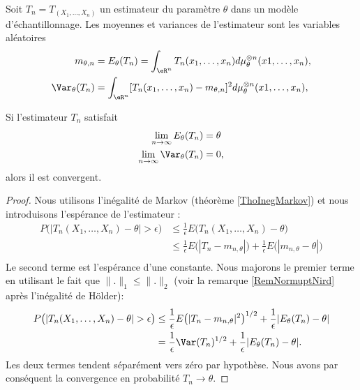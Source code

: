 Soit \( T_n=T_(X_1,\ldots,X_n)\) un estimateur du paramètre \( \theta\) dans un modèle d'échantillonnage. Les moyennes et variances de l'estimateur sont les variables aléatoires
\begin{subequations}
    \begin{align}
        m_{\theta,n}&=E_{\theta}(T_n)=\int_{\eR^n}T_n(x_1,\ldots,x_n)d\mu_{\theta}^{\otimes n}(x1,\ldots,x_n),\\
        \Var_{\theta}(T_n)&=\int_{\eR^n}[T_n(x_1,\ldots,x_n)-m_{\theta,n}]^2d\mu_{\theta}^{\otimes n}(x1,\ldots,x_n),
    \end{align}
\end{subequations}

\begin{lemma}
    Si l'estimateur \( T_n\) satisfait
    \begin{subequations}
        \begin{align}
            \lim_{n\to \infty} E_{\theta}(T_n)&=\theta\\
            \lim_{n\to \infty} \Var_{\theta}(T_n)&=0,
        \end{align}
    \end{subequations}
    alors il est convergent.
\end{lemma}

\begin{proof}
    Nous utilisons l'inégalité de Markov (théorème \ref{ThoInegMarkov}) et nous introduisons l'espérance de l'estimateur :
    \begin{subequations}
        \begin{align}
            P\big( | T_n(X_1,\ldots ,X_n)-\theta |>\epsilon \big)&\leq\frac{1}{ \epsilon }E\big( T_n(X_1,\ldots,X_n)-\theta \big)\\
            &\leq \frac{1}{ \epsilon }E\big( | T_n-m_{n,\theta} | \big)+\frac{1}{ \epsilon }E\big(| m_{n,\theta}-\theta |\big)\\
        \end{align}
    \end{subequations}
    Le second terme est l'espérance d'une constante. Nous majorons le premier terme en utilisant le fait que \( \| . \|_1\leq\| . \|_2\) (voir la remarque \ref{RemNormuptNird} après l'inégalité de Hölder):
    \begin{subequations}
        \begin{align}
            P\big( | T_n(X_1,\ldots ,X_n)-\theta |>\epsilon \big)&\leq \frac{1}{ \epsilon }E\big( | T_n-m_{n,\theta} |^2 \big)^{1/2}+\frac{1}{ \epsilon }| E_{\theta}(T_n)-\theta |\\
            &=\frac{1}{ \epsilon }\Var(T_n)^{1/2}+\frac{1}{ \epsilon }| E_{\theta}(T_n)-\theta |.
        \end{align}
    \end{subequations}
    Les deux termes tendent séparément vers zéro par hypothèse. Nous avons par conséquent la convergence en probabilité \( T_n\to \theta\).
\end{proof}

